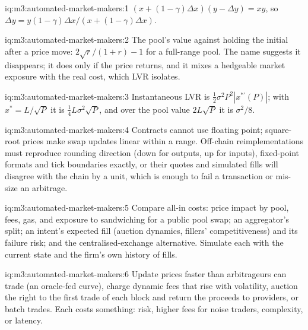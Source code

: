 \begin{solution}{iq:m3:automated-market-makers:1}
$(x + (1 - \gamma)\Delta x)(y - \Delta y) = xy$, so $\Delta y = y(1 - \gamma)\Delta x/(x + (1 - \gamma)\Delta x)$.
\end{solution}

\begin{solution}{iq:m3:automated-market-makers:2}
The pool's value against holding the initial  after a price move: $2\sqrt r/(1 + r) - 1$ for a full-range pool. The name suggests it
disappears; it does only if the price returns, and it mixes a hedgeable market exposure with the real cost, which LVR isolates.
\end{solution}

\begin{solution}{iq:m3:automated-market-makers:3}
Instantaneous LVR is $\tfrac12\sigma^2P^2|x^{*\prime}(P)|$; with $x^* = L/\sqrt P$ it is $\tfrac14L\sigma^2\sqrt P$, and over the pool value
$2L\sqrt P$ it is $\sigma^2/8$.
\end{solution}

\begin{solution}{iq:m3:automated-market-makers:4}
Contracts cannot use floating point; square-root prices make swap updates linear within a range. Off-chain reimplementations must reproduce
rounding direction (down for outputs, up for inputs), fixed-point formats and tick boundaries exactly, or their quotes and simulated fills will
disagree with the chain by a unit, which is enough to fail a transaction or mis-size an arbitrage.
\end{solution}

\begin{solution}{iq:m3:automated-market-makers:5}
Compare all-in costs: price impact by pool, fees, gas, and exposure to sandwiching for a public pool swap; an aggregator's split; an intent's
expected fill (auction dynamics, fillers' competitiveness) and its failure risk; and the centralised-exchange alternative. Simulate each with
the current state and the firm's own history of fills.
\end{solution}

\begin{solution}{iq:m3:automated-market-makers:6}
Update prices faster than arbitrageurs can trade (an oracle-fed curve), charge dynamic fees that rise with volatility, auction the right to the
first trade of each block and return the proceeds to providers, or batch trades. Each costs something:  risk, higher fees for noise
traders, complexity, or latency.
\end{solution}
